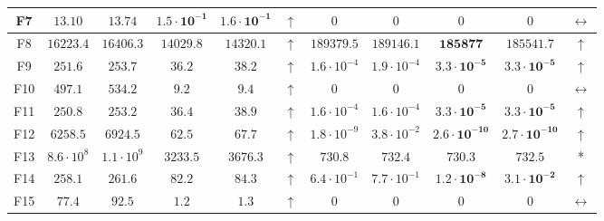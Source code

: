 \begin{table*}[!t]
\begin{scriptsize}
\begin{tabular}{c || c c | c c c || c c | c c c}
F7  & $13.10$              & $13.74$            & $\mathbf{1.5 \cdot 10^{-1}}$  & $\mathbf{1.6 \cdot 10^{-1}}$  & $\uparrow$        & $0$                  & $0$                  & $0$                  & $0$                  & $\leftrightarrow$  \\ \hline
F8  & $16223.4$            & $16406.3$          & $\mathbf{14029.8}$            & $\mathbf{14320.1}$            & $\uparrow$        & $189379.5$           & $189146.1$           & $\mathbf{185877}$             & $\mathbf{185541.7}$           & $\uparrow$         \\ \hline
F9  & $251.6$              & $253.7$            & $\mathbf{36.2}$               & $\mathbf{38.2}$               & $\uparrow$        & $1.6 \cdot 10^{-4}$  & $1.9 \cdot 10^{-4}$  & $\mathbf{3.3 \cdot 10^{-5}}$  & $\mathbf{3.3 \cdot 10^{-5}}$  & $\uparrow$         \\ \hline
F10 & $497.1$              & $534.2$            & $\mathbf{9.2}$                & $\mathbf{9.4}$                & $\uparrow$        & $0$                  & $0$                  & $0$                  & $0$                  & $\leftrightarrow$  \\ \hline
F11 & $250.8$              & $253.2$            & $\mathbf{36.4}$               & $\mathbf{38.9}$               & $\uparrow$        & $1.6 \cdot 10^{-4}$  & $1.6 \cdot 10^{-4}$  & $\mathbf{3.3 \cdot 10^{-5}}$  & $\mathbf{3.3 \cdot 10^{-5}}$  & $\uparrow$         \\ \hline
F12 & $6258.5$             & $6924.5$           & $\mathbf{62.5}$               & $\mathbf{67.7}$               & $\uparrow$        & $1.8 \cdot 10^{-9}$  & $3.8 \cdot 10^{-2}$  & $\mathbf{2.6 \cdot 10^{-10}}$ & $\mathbf{2.7 \cdot 10^{-10}}$ & $\uparrow$         \\ \hline
F13 & $8.6 \cdot 10^{8}$   & $1.1 \cdot 10^{9}$ & $\mathbf{3233.5}$             & $\mathbf{3676.3}$             & $\uparrow$        & $730.8$              & $732.4$              & $730.3$              & $732.5$              & *                  \\ \hline
F14 & $258.1$              & $261.6$            & $\mathbf{82.2}$               & $\mathbf{84.3}$               & $\uparrow$        & $6.4 \cdot 10^{-1}$  & $7.7 \cdot 10^{-1}$  & $\mathbf{1.2 \cdot 10^{-8}}$  & $\mathbf{3.1 \cdot 10^{-2}}$  & $\uparrow$         \\ \hline
F15 & $77.4$               & $92.5$             & $\mathbf{1.2}$                & $\mathbf{1.3}$                & $\uparrow$        & $0$                  & $0$                  & $0$                  & $0$                  & $\leftrightarrow$  \\ \hline

\end{tabular}
\end{scriptsize}
\end{table*}

